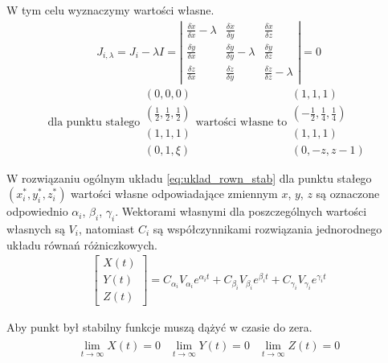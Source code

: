 W tym celu wyznaczymy wartości własne.
\begin{align}
J_{i,\lambda} = J_i - \lambda I = 
\left|
\begin{array}{ccc}
\frac{\delta \dot{x}}{\delta x}-\lambda & \frac{\delta \dot{x}}{\delta y} & \frac{\delta \dot{x}}{\delta z} \\
\frac{\delta \dot{y}}{\delta x} & \frac{\delta \dot{y}}{\delta y}-\lambda & \frac{\delta \dot{y}}{\delta z} \\
\frac{\delta \dot{z}}{\delta x} & \frac{\delta \dot{z}}{\delta y} & \frac{\delta \dot{z}}{\delta z}-\lambda
\end{array}
\right| = 0
\end{align}
\begin{equation*}
\text{dla punktu stałego}
\begin{array}{c}
(0,0,0) \\
(\frac{1}{2},\frac{1}{2},\frac{1}{2}) \\
(1,1,1) \\
(0,1,\xi)
\end{array}
\text{wartości własne to}
\begin{array}{c}
(1,1,1)\\
(-\frac{1}{2}, \frac{1}{4}, \frac{1}{4})\\
(1,1,1)\\
(0,-z, z-1)
\end{array}
\end{equation*}

W rozwiązaniu ogólnym układu \ref{eq:uklad_rown_stab} dla punktu stałego $(x^*_i, y^*_i, z^*_i)$ wartości własne odpowiadające zmiennym $x$, $y$, $z$ są oznaczone odpowiednio $\alpha_i$, $\beta_i$, $\gamma_i$. Wektorami własnymi dla poszczególnych wartości własnych są $V_i$, natomiast $C_i$ są współczynnikami rozwiązania jednorodnego układu równań różniczkowych. 
\begin{align}\label{eq:rozw_ur}
\left[ \begin{array}{c}
X(t)\\
Y(t)\\
Z(t)
\end{array}
\right] = C_{\alpha_i} V_{\alpha_i} e^{\alpha_it} + C_{\beta_i} V_{\beta_i} e^{\beta_it} + C_{\gamma_i} V_{\gamma_i} e^{\gamma_it}
\end{align}

Aby punkt był stabilny funkcje muszą dążyć w czasie do zera.
\begin{align}
\begin{array}{ccc}
\displaystyle\lim_{t \to \infty} X(t)=0 & \displaystyle\lim_{t \to \infty} Y(t)=0 & \displaystyle\lim_{t \to \infty} Z(t)=0
\end{array}
\end{align}

